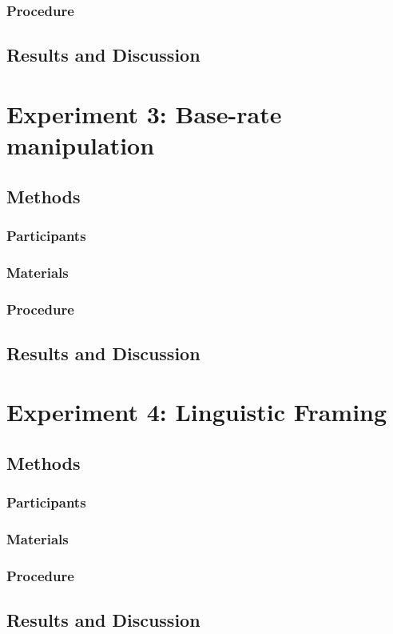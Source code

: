 \documentclass[man,noapacite]{apa2}
\begin{document}
\subsubsection{Procedure}

\subsection{Results and Discussion}

\section{Experiment 3: Base-rate manipulation}

\subsection{Methods}

\subsubsection{Participants}
\subsubsection{Materials}
\subsubsection{Procedure}

\subsection{Results and Discussion}


\section{Experiment 4: Linguistic Framing}

\subsection{Methods}

\subsubsection{Participants}
\subsubsection{Materials}
\subsubsection{Procedure}

\subsection{Results and Discussion}

\newpage



\end{document}
